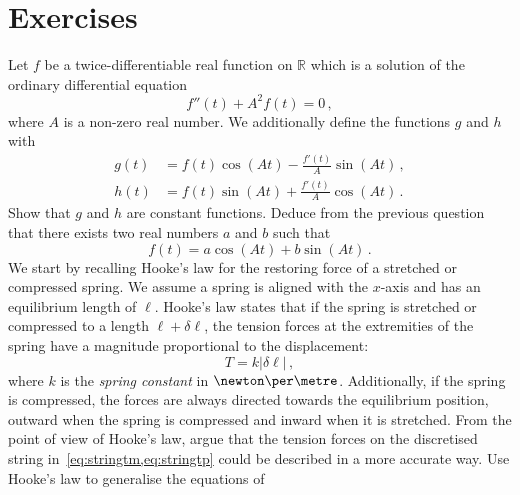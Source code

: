 \section{Exercises}
\begin{ExerciseList}
  \Exercise[label=odesincos] Let $f$ be a twice-differentiable real function on $\mathbb{R}$ which is
  a solution of the ordinary differential equation
  \begin{equation}
    f''(t) + A^2 f(t) = 0\,,
  \end{equation}
  where $A$ is a non-zero real number. We additionally define the functions $g$ and $h$
  with
  \begin{align}
    g(t)&=f(t)\cos(At)-\frac{f'(t)}{A}\sin(At)\label{eq:csgdef}\,,\\
    h(t)&=f(t)\sin(At)+\frac{f'(t)}{A}\cos(At)\label{eq:cshdef}\,.
  \end{align}
  \Question Show that $g$ and $h$ are constant functions.
  \Question Deduce from the previous question that there exists two real numbers $a$ and $b$
  such that
  \begin{equation}
    f(t)=a\cos(At)+b\sin(At)\,.\label{eq:csfsol}
  \end{equation}
  \Exercise[label=stringhooke] We start by recalling Hooke's law for the restoring force
  of a stretched or compressed spring. We assume a spring is aligned with the $x$-axis and
  has an equilibrium length of $\ell$. Hooke's law states that if the spring is stretched
  or compressed to a length $\ell+\delta\ell$, the tension forces at the extremities of
  the spring have a magnitude proportional to the displacement:
  \begin{equation}
    T=k|\delta\ell|\,,
  \end{equation}
  where $k$ is the \emph{spring constant} in $\newton\per\metre$. Additionally, if the
  spring is compressed, the forces are always directed towards the equilibrium position,
  \ie outward when the spring is compressed and inward when it is stretched. \Question
  From the point of view of Hooke's law, argue that the tension forces on the discretised
  string in~\cref{eq:stringtm,eq:stringtp} could be described in a more accurate way.
  \Question Use Hooke's law to generalise the equations of

\end{ExerciseList}
